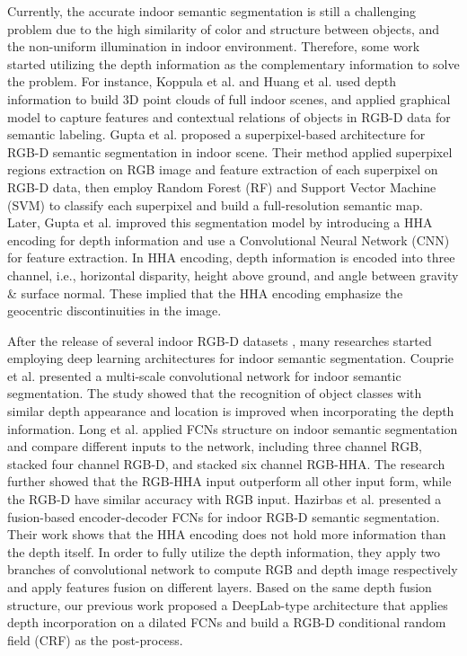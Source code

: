 \documentclass[runningheads]{llncs}
\begin{document}
Currently, the accurate indoor semantic segmentation is still a challenging problem due to the high similarity of color and structure between objects, and the non-uniform illumination in indoor environment. Therefore, some work started utilizing the depth information as the complementary information to solve the problem. For instance, Koppula et al. \cite{koppula2011semantic} and Huang et al. \cite{huang2014object} used depth information to build 3D point clouds of full indoor scenes, and applied graphical model to capture features and contextual relations of objects in RGB-D data for semantic labeling. Gupta et al. \cite{gupta2013perceptual} proposed a superpixel-based architecture for RGB-D semantic segmentation in indoor scene. Their method applied superpixel regions extraction on RGB image and feature extraction of each superpixel on RGB-D data, then employ Random Forest (RF) and Support Vector Machine (SVM) to classify each superpixel and build a full-resolution semantic map. Later, Gupta et al. \cite{gupta2014learning} improved this segmentation model by introducing a HHA encoding for depth information and use a Convolutional Neural Network (CNN) for feature extraction. In HHA encoding, depth information is encoded into three channel, i.e., horizontal disparity, height above ground, and angle between gravity \& surface normal. These implied that the HHA encoding emphasize the geocentric discontinuities in the image.

After the release of several indoor RGB-D datasets \cite{silberman2011indoor,janoch2011category,silberman2012indoor,song2015sun}, many researches started employing deep learning architectures for indoor semantic segmentation. Couprie et al. \cite{couprie2013indoor} presented a multi-scale convolutional network for indoor semantic segmentation. The study showed that the recognition of object classes with similar depth appearance and location is improved when incorporating the depth information. Long et al. \cite{long2015fully} applied FCNs structure on indoor semantic segmentation and compare different inputs to the network, including three channel RGB, stacked four channel RGB-D, and stacked six channel RGB-HHA. The research further showed that the RGB-HHA input outperform all other input form, while the RGB-D have similar accuracy with RGB input. Hazirbas et al. \cite{hazirbas2016fusenet} presented a fusion-based encoder-decoder FCNs for indoor RGB-D semantic segmentation. Their work shows that the HHA encoding does not hold more information than the depth itself. In order to fully utilize the depth information, they apply two branches of convolutional network to compute RGB and depth image respectively and apply features fusion on different layers. Based on the same depth fusion structure, our previous work \cite{jiang2017incorporating} proposed a DeepLab-type architecture \cite{chen2016deeplab} that applies depth incorporation on a dilated FCNs and build a RGB-D conditional random field (CRF) as the post-process.
\end{document}
